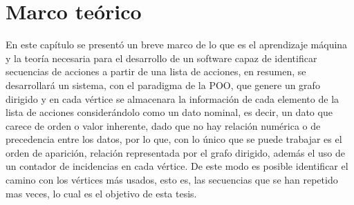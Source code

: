 
\chapter{Marco te\'orico}
\label{sec:chapter3}







En este cap\'itulo se present\'o un breve marco de lo que es el aprendizaje
 m\'aquina y la teor\'ia necesaria para el desarrollo de un software capaz de 
 identificar secuencias de acciones a partir de una lista de acciones, en 
 resumen, se desarrollar\'a un sistema, con el paradigma de la POO, que genere 
 un grafo dirigido y en cada v\'ertice se almacenara la informaci\'on de cada 
 elemento de la lista de acciones consider\'andolo como un dato nominal, es 
 decir, un dato que carece de orden o valor inherente, dado que no hay
 relaci\'on num\'erica o de precedencia entre los datos, por lo que, con lo 
 \'unico que se puede trabajar es el orden de aparici\'on, relaci\'on 
 representada por el grafo dirigido, adem\'as el uso de un contador de 
 incidencias en cada v\'ertice. De este modo es posible identificar el camino 
 con los v\'ertices m\'as usados, esto es, las secuencias que se han repetido 
 mas veces, lo cual es el objetivo de esta tesis.

